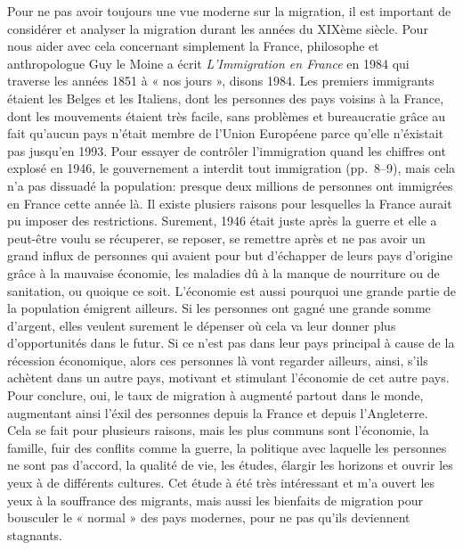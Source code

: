 \documentclass[12pt]{article}
\begin{document}
Pour ne pas avoir toujours une vue moderne sur la migration, il est
important de considérer et analyser la migration durant les années du
XIXème siècle. Pour nous aider avec cela concernant simplement la
France, philosophe et anthropologue Guy le Moine a écrit
\textit{L'Immigration en France} en 1984 qui traverse les années 1851
à « nos jours », disons 1984. Les premiers immigrants étaient les
Belges et les Italiens, dont les personnes des pays voisins à la
France, dont les mouvements étaient très facile, sans problèmes et
bureaucratie grâce au fait qu'aucun pays n'était membre de l'Union
Européene parce qu'elle n'éxistait pas jusqu'en 1993. Pour essayer de
contrôler l'immigration quand les chiffres ont explosé en 1946, le
gouvernement a interdit tout immigration (pp.\ 8--9), mais cela n'a
pas dissuadé la population: presque deux millions de personnes ont
immigrées en France cette année là. Il existe plusiers raisons pour
lesquelles la France aurait pu imposer des restrictions. Surement,
1946 était juste après la guerre et elle a peut-être voulu se
récuperer, se reposer, se remettre après et ne pas avoir un grand
influx de personnes qui avaient pour but d'échapper de leurs pays
d'origine grâce à la mauvaise économie, les maladies dû à la manque de
nourriture ou de sanitation, ou quoique ce soit. L'économie est aussi
pourquoi une grande partie de la population émigrent ailleurs. Si les
personnes ont gagné une grande somme d'argent, elles veulent surement
le dépenser où cela va leur donner plus d'opportunités dans le futur.
Si ce n'est pas dans leur pays principal à cause de la récession
économique, alors ces personnes là vont regarder ailleurs, ainsi,
s'ils achètent dans un autre pays, motivant et stimulant l'économie
de cet autre pays.\\

Pour conclure, oui, le taux de migration à augmenté partout dans le
monde, augmentant ainsi l'éxil des personnes depuis la France et
depuis l'Angleterre. Cela se fait pour plusieurs raisons, mais les
plus communs sont l'économie, la famille, fuir des conflits comme la
guerre, la politique avec laquelle les personnes ne sont pas d'accord,
la qualité de vie, les études, élargir les horizons et ouvrir les yeux
à de différents cultures. Cet étude à été très intéressant et m'a
ouvert les yeux à la souffrance des migrants, mais aussi les bienfaits
de migration pour bousculer le « normal » des pays modernes, pour ne
pas qu'ils deviennent stagnants.

\nocite{*}



\end{document}
